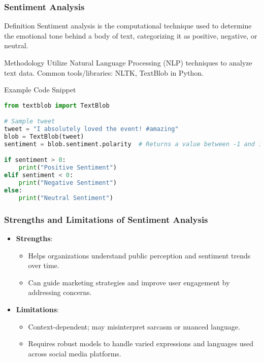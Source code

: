 \documentclass{beamer}
\begin{document}
\begin{frame}[fragile]
    \frametitle{Sentiment Analysis}
    \begin{block}{Definition}
        Sentiment analysis is the computational technique used to determine the emotional tone behind a body of text, categorizing it as positive, negative, or neutral.
    \end{block}

    \begin{block}{Methodology}
        Utilize Natural Language Processing (NLP) techniques to analyze text data.  
        Common tools/libraries: NLTK, TextBlob in Python.
    \end{block}
    
    \begin{block}{Example Code Snippet}
    \begin{lstlisting}[language=Python]
from textblob import TextBlob

# Sample tweet
tweet = "I absolutely loved the event! #amazing"
blob = TextBlob(tweet)
sentiment = blob.sentiment.polarity  # Returns a value between -1 and 1

if sentiment > 0:
    print("Positive Sentiment")
elif sentiment < 0:
    print("Negative Sentiment")
else:
    print("Neutral Sentiment")
    \end{lstlisting}
    \end{block}
\end{frame}

\begin{frame}[fragile]
    \frametitle{Strengths and Limitations of Sentiment Analysis}
    
    \begin{itemize}
        \item \textbf{Strengths}:
        \begin{itemize}
            \item Helps organizations understand public perception and sentiment trends over time.
            \item Can guide marketing strategies and improve user engagement by addressing concerns.
        \end{itemize}
        
        \item \textbf{Limitations}:
        \begin{itemize}
            \item Context-dependent; may misinterpret sarcasm or nuanced language.
            \item Requires robust models to handle varied expressions and languages used across social media platforms.
        \end{itemize}
    \end{itemize}
\end{frame}
\end{document}
